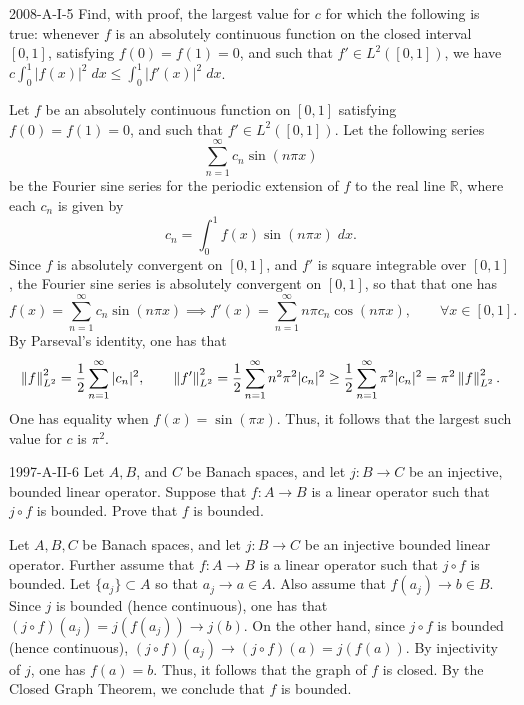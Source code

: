 \documentclass{article}
\begin{document}
	\begin{prb}{2008-A-I-5}
		Find, with proof, the largest value for $c$ for which the following is true: whenever $f$ is an absolutely continuous function on the closed interval $[0,1]$, satisfying $f(0) = f(1) = 0$, and such that $f' \in L^2([0,1])$, we have $c\int_{0}^{1}|f(x)|^2\;dx \leq \int_{0}^{1}|f'(x)|^2\;dx$. 
	\end{prb}
	Let $f$ be an absolutely continuous function on $[0,1]$ satisfying $f(0) = f(1) = 0$, and such that $f' \in L^2([0,1])$. Let the following series 
	\begin{equation*}
		\sum_{n = 1}^{\infty}c_{n}\sin(n\pi x)
	\end{equation*}
	be the Fourier sine series for the periodic extension of $f$ to the real line $\mathbb{R}$, 
	where each $c_{n}$ is given by 
	\begin{equation*}
		c_{n} = \int_{0}^{1}f(x)\sin(n\pi x)\;dx. 
	\end{equation*}
	Since $f$ is absolutely convergent on $[0,1]$, and $f'$ is square integrable over $[0,1]$,  the Fourier sine series is absolutely convergent on $[0,1]$, so that that one has 
	\begin{equation*}
		f(x) = \sum_{n = 1}^{\infty}c_{n}\sin(n\pi x) \implies f'(x) = \sum_{n = 1}^{\infty} n\pi c_{n}\cos(n\pi x), \qquad \forall x \in [0,1]. 
	\end{equation*}
	By Parseval's identity, one has that 
	\begin{equation*}
		\left\Vert f \right\Vert_{L^2}^2 = \frac{1}{2}\sum_{n = 1}^{\infty}|c_{n}|^{2}, \qquad \left\Vert f' \right\Vert_{L^2}^2 = \frac{1}{2}\sum_{n = 1}^{\infty}n^{2}\pi^{2}|c_{n}|^{2} \geq \frac{1}{2}\sum_{n = 1}^{\infty}\pi^{2}|c_{n}|^{2}  = \pi^{2}\left\Vert f \right\Vert_{L^{2}}^{2}. 
	\end{equation*}
	One has equality when $f(x) = \sin(\pi x)$. Thus, it follows that the largest such value for $c$ is $\pi^2$. 
	
	\begin{prb}{1997-A-II-6}
		Let $A, B$, and $C$ be Banach spaces, and let $j: B \to C$ be an injective, bounded linear operator. Suppose that $f: A \to B$ is a linear operator such that $j \circ f$ is bounded. Prove that $f$ is bounded. 
	\end{prb}
	Let $A, B, C$ be Banach spaces, and let $j: B \to C$ be an injective bounded linear operator. Further assume that $f: A \to B$ is a linear operator such that $j \circ f$ is bounded. Let $\{a_{j}\} \subset A$ so that $a_{j} \to a \in A$. Also assume that $f(a_{j}) \to b \in B$. Since $j$ is bounded (hence continuous), one has that $(j \circ f)(a_j) = j(f(a_j)) \to j(b)$. On the other hand, since $j \circ f$ is bounded (hence continuous), $(j \circ f)(a_{j}) \to(j \circ f)(a) = j(f(a))$. By injectivity of $j$, one has $f(a) = b$. Thus, it follows that the graph of $f$ is closed. By the Closed Graph Theorem, we conclude that $f$ is bounded. 
	
\end{document}
